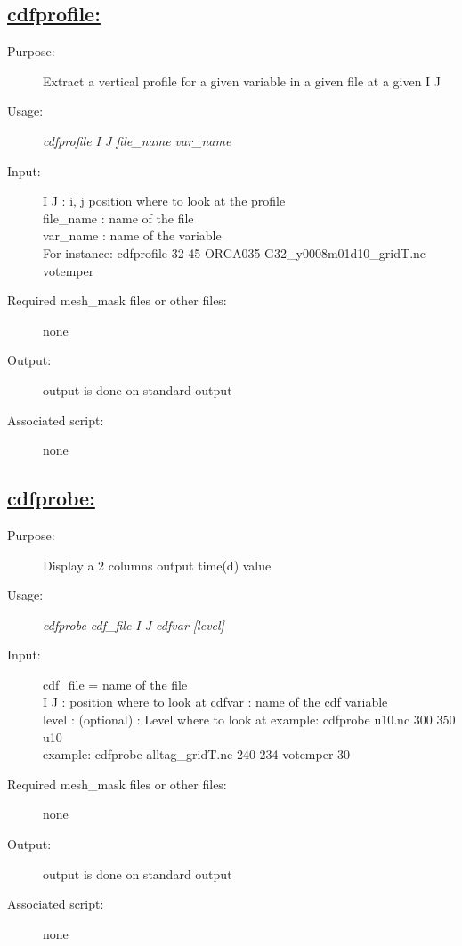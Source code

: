 \documentclass[a4paper,11pt]{article}
\begin{document}
\subsection*{\underline{cdfprofile:}}
\begin{description}
\item[Purpose:] Extract a vertical profile for a given variable in a given file at a given I J
\item[Usage:] {\em cdfprofile  I  J file\_name var\_name }
\item[Input:] I J : i, j position where to look at the profile \\
   file\_name : name of the file \\
   var\_name : name of the variable \\
For instance: cdfprofile  32 45 ORCA035-G32\_y0008m01d10\_gridT.nc votemper  \\
\item[Required mesh\_mask files or other files:] none
\item[Output:] output is done on standard output
\item[Associated script:] none
\end{description}

\newpage
\subsection*{\underline{cdfprobe:}}
\begin{description}
\item[Purpose:]Display a 2 columns output time(d) value
\item[Usage:] {\em cdfprobe  cdf\_file I J  cdfvar [level]}
\item[Input:] cdf\_file =  name of the file \\
    I J : position where to look at
   cdfvar : name of the cdf variable  \\
   level : (optional) : Level where to look at
   example:  cdfprobe u10.nc 300 350 u10  \\
   example:  cdfprobe alltag\_gridT.nc 240 234 votemper 30
\item[Required mesh\_mask files or other files:] none
\item[Output:] output is done on standard output
\item[Associated script:] none
\end{description}
\end{document}
